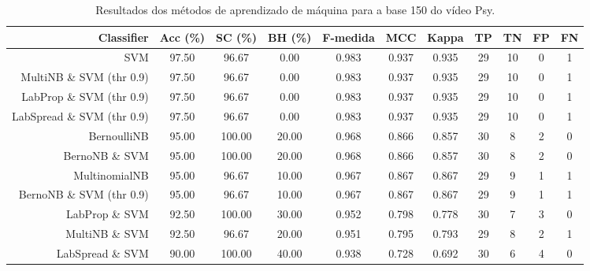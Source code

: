 \begin{table}[!htb]
\centering
\caption{Resultados dos métodos de aprendizado de máquina para a base 150 do vídeo Psy.}
\label{tab:Psy-150}
\begin{tabular}{r|c|c|c|c|c|c|c|c|c|c}
\hline\hline
Classifier & Acc (\%) & SC (\%) & BH (\%) & F-medida & MCC & Kappa & TP & TN & FP & FN \\ \hline
SVM & 97.50 & 96.67 & 0.00 & 0.983 & 0.937 & 0.935 & 29 & 10 & 0 & 1 \\ 
MultiNB \& SVM (thr 0.9) & 97.50 & 96.67 & 0.00 & 0.983 & 0.937 & 0.935 & 29 & 10 & 0 & 1 \\ 
LabProp \& SVM (thr 0.9) & 97.50 & 96.67 & 0.00 & 0.983 & 0.937 & 0.935 & 29 & 10 & 0 & 1 \\ 
LabSpread \& SVM (thr 0.9) & 97.50 & 96.67 & 0.00 & 0.983 & 0.937 & 0.935 & 29 & 10 & 0 & 1 \\ 
BernoulliNB & 95.00 & 100.00 & 20.00 & 0.968 & 0.866 & 0.857 & 30 & 8 & 2 & 0 \\ 
BernoNB \& SVM & 95.00 & 100.00 & 20.00 & 0.968 & 0.866 & 0.857 & 30 & 8 & 2 & 0 \\ 
MultinomialNB & 95.00 & 96.67 & 10.00 & 0.967 & 0.867 & 0.867 & 29 & 9 & 1 & 1 \\ 
BernoNB \& SVM (thr 0.9) & 95.00 & 96.67 & 10.00 & 0.967 & 0.867 & 0.867 & 29 & 9 & 1 & 1 \\ 
LabProp \& SVM & 92.50 & 100.00 & 30.00 & 0.952 & 0.798 & 0.778 & 30 & 7 & 3 & 0 \\ 
MultiNB \& SVM & 92.50 & 96.67 & 20.00 & 0.951 & 0.795 & 0.793 & 29 & 8 & 2 & 1 \\ 
LabSpread \& SVM & 90.00 & 100.00 & 40.00 & 0.938 & 0.728 & 0.692 & 30 & 6 & 4 & 0 \\ 
\hline\hline
\end{tabular}
\end{table}
